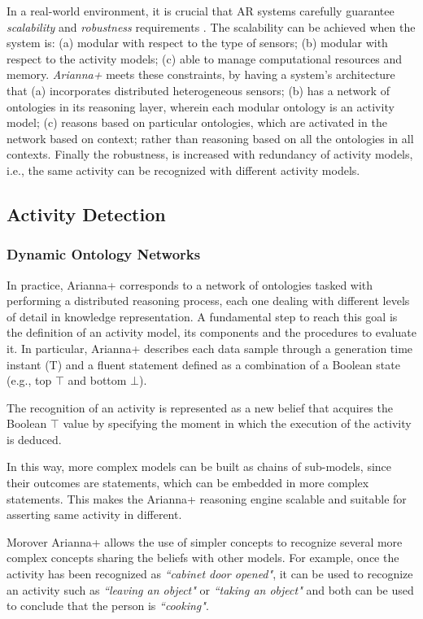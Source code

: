 \documentclass{thesisreport}
\begin{document}
In a real-world environment, it is crucial that AR systems carefully guarantee \textit{scalability} and \textit{robustness} requirements \cite{kareem2018arianna}.
The scalability can be achieved when the system is: (a) modular with respect to the type of sensors; (b) modular with respect to the activity models; (c) able to manage computational resources and memory. \emph{Arianna+} meets these constraints, by having a system's architecture that (a) incorporates distributed heterogeneous sensors; (b) has a network of ontologies in its reasoning layer, wherein each modular ontology is an activity model; (c) reasons based on particular ontologies, which are activated in the network based on context; rather than reasoning based on all the ontologies in all contexts.
Finally the robustness, is increased with redundancy of activity models, i.e., the same activity can be recognized with different activity models.

 \subsection{Activity Detection}
 \subsubsection{Dynamic Ontology Networks}
 In practice, Arianna+ corresponds to a network of ontologies tasked with performing a distributed reasoning process, each one dealing with different levels of detail in knowledge representation. 
 A fundamental step to reach this goal is  the definition of an activity model, its components and the procedures to evaluate it. In particular, Arianna+ describes each data sample through a generation time instant (T) and a fluent statement defined as a combination of a Boolean state (e.g., top $\top$ and bottom $\bot$).
 
 The recognition of an activity is represented as a new belief that acquires the Boolean $\top$ value by specifying the moment in which the execution of the activity is deduced.
 
 In this way, more complex models can be built as chains of sub-models, since their outcomes are statements, which can be embedded in more complex statements.
 This makes the Arianna+ reasoning engine scalable and suitable for asserting same activity in different.
 
Morover Arianna+ allows the use of simpler concepts to recognize several more complex concepts sharing the beliefs  with other models. For example, once the activity has been recognized as \textit{``cabinet door opened"}, it can be used to recognize an activity such as \textit{``leaving an object"} or \textit{``taking an object"} and both can be used to conclude that the person is \textit{``cooking"}.
\end{document}
